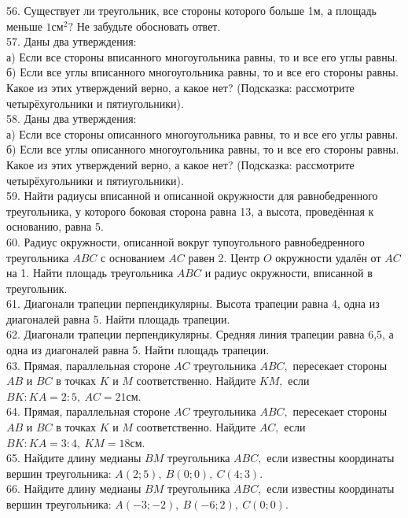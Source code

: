 56. Существует ли треугольник, все стороны которого больше 1м, а площадь меньше $1\text{см}^2?$ Не забудьте обосновать ответ.\\
57. Даны два утверждения:\\
а) Если все стороны вписанного многоугольника равны, то и все его углы равны.\\
б) Если все углы вписанного многоугольника равны, то и все его стороны равны.\\
Какое из этих утверждений верно, а какое нет? (Подсказка: рассмотрите четырёхугольники и пятиугольники).\\
58. Даны два утверждения:\\
а) Если все стороны описанного многоугольника равны, то и все его углы равны.\\
б) Если все углы описанного многоугольника равны, то и все его стороны равны.\\
Какое из этих утверждений верно, а какое нет? (Подсказка: рассмотрите четырёхугольники и пятиугольники).\\
59. Найти радиусы вписанной и описанной окружности для равнобедренного треугольника, у которого боковая сторона равна 13, а высота, проведённая к основанию, равна 5.\\
60. Радиус окружности, описанной вокруг тупоугольного равнобедренного треугольника $ABC$ с основанием $AC$ равен 2. Центр $O$ окружности удалён от $AC$ на 1. Найти площадь треугольника $ABC$ и радиус окружности, вписанной в треугольник.\\
61. Диагонали трапеции перпендикулярны. Высота трапеции равна 4, одна из диагоналей равна 5. Найти площадь трапеции.\\
62. Диагонали трапеции перпендикулярны. Средняя линия трапеции равна 6,5, а одна из диагоналей равна 5. Найти площадь трапеции.\\
63. Прямая, параллельная стороне $AC$ треугольника $ABC,$ пересекает стороны $AB$ и $BC$ в точках $K$ и $M$ соответственно. Найдите $KM,$ если $BK:KA=2:5,\ AC=21$см.\\
64. Прямая, параллельная стороне $AC$ треугольника $ABC,$ пересекает стороны $AB$ и $BC$ в точках $K$ и $M$ соответственно. Найдите $AC,$ если $BK:KA=3:4,\ KM=18$см.\\
65. Найдите длину медианы $BM$ треугольника $ABC,$ если известны координаты вершин треугольника: $A(2;5),\ B(0;0),\ C(4;3).$\\
66. Найдите длину медианы $BM$ треугольника $ABC,$ если известны координаты вершин треугольника: $A(-3;-2),\ B(-6;2),\ C(0;0).$\\
